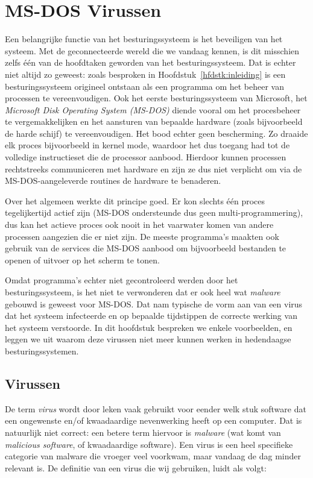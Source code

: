 \appendix
\chapter{MS-DOS Virussen}

Een belangrijke functie van het besturingssysteem is het beveiligen van het systeem. Met de geconnecteerde wereld die we vandaag kennen, is dit misschien zelfs \'e\'en van de hoofdtaken geworden van het besturingssysteem. Dat is echter niet altijd zo geweest: zoals besproken in Hoofdstuk~\ref{hfdstk:inleiding} is een besturingssysteem origineel ontstaan als een programma om het beheer van processen te vereenvoudigen. Ook het eerste besturingssysteem van Microsoft, het \emph{Microsoft Disk Operating System (MS-DOS)} diende vooral om het procesbeheer te vergemakkelijken en het aansturen van bepaalde hardware (zoals bijvoorbeeld de harde schijf) te vereenvoudigen. Het bood echter geen bescherming. Zo draaide elk proces bijvoorbeeld in kernel mode, waardoor het dus toegang had tot de volledige instructieset die de processor aanbood. Hierdoor kunnen processen rechtstreeks communiceren met hardware en zijn ze dus niet verplicht om via de MS-DOS-aangeleverde routines de hardware te benaderen.

Over het algemeen werkte dit principe goed. Er kon slechts \'e\'en proces tegelijkertijd actief zijn (MS-DOS ondersteunde dus geen multi-programmering), dus kan het actieve proces ook nooit in het vaarwater komen van andere processen aangezien die er niet zijn. De meeste programma's maakten ook gebruik van de services die MS-DOS aanbood om bijvoorbeeld bestanden te openen of uitvoer op het scherm te tonen.

Omdat programma's echter niet gecontroleerd werden door het besturingssysteem, is het niet te verwonderen dat er ook heel wat \emph{malware} gebouwd is geweest voor MS-DOS. Dat nam typische de vorm aan van een virus dat het systeem infecteerde en op bepaalde tijdstippen de correcte werking van het systeem verstoorde. In dit hoofdstuk bespreken we enkele voorbeelden, en leggen we uit waarom deze virussen niet meer kunnen werken in hedendaagse besturingssystemen.

\section{Virussen}

De term \emph{virus} wordt door leken vaak gebruikt voor eender welk stuk software dat een ongewenste en/of kwaadaardige nevenwerking heeft op een computer. Dat is natuurlijk niet correct: een betere term hiervoor is \emph{malware} (wat komt van \emph{malicious software}, of kwaadaardige software). Een virus is een heel specifieke categorie van malware die vroeger veel voorkwam, maar vandaag de dag minder relevant is. De definitie van een virus die wij gebruiken, luidt als volgt:

